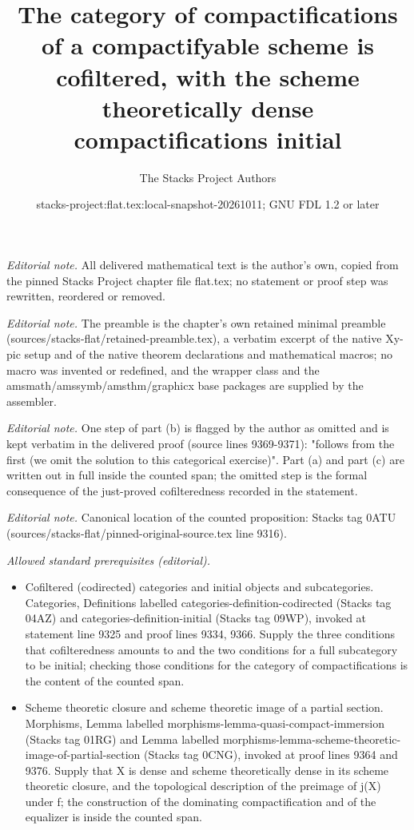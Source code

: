 \documentclass[10pt,a4paper]{amsart}
\title{The category of compactifications of a compactifyable scheme is cofiltered, with the scheme theoretically dense compactifications initial}
\author{The Stacks Project Authors}
\date{stacks-project:flat.tex:local-snapshot-20261011; GNU FDL 1.2 or later}
\theoremstyle{plain}
\theoremstyle{definition}
\theoremstyle{remark}
\numberwithin{equation}{subsection}
\begin{document}
\maketitle
\noindent\textit{Editorial note.} All delivered mathematical text is the author's own, copied from the pinned Stacks Project chapter file flat.tex; no statement or proof step was rewritten, reordered or removed.\par\medskip
\noindent\textit{Editorial note.} The preamble is the chapter's own retained minimal preamble (sources/stacks-flat/retained-preamble.tex), a verbatim excerpt of the native Xy-pic setup and of the native theorem declarations and mathematical macros; no macro was invented or redefined, and the wrapper class and the amsmath/amssymb/amsthm/graphicx base packages are supplied by the assembler.\par\medskip
\noindent\textit{Editorial note.} One step of part (b) is flagged by the author as omitted and is kept verbatim in the delivered proof (source lines 9369-9371): "follows from the first (we omit the solution to this categorical exercise)". Part (a) and part (c) are written out in full inside the counted span; the omitted step is the formal consequence of the just-proved cofilteredness recorded in the statement.\par\medskip
\noindent\textit{Editorial note.} Canonical location of the counted proposition: Stacks tag 0ATU (sources/stacks-flat/pinned-original-source.tex line 9316).\par\medskip
\noindent\textit{Allowed standard prerequisites (editorial).}\begin{itemize}
\item Cofiltered (codirected) categories and initial objects and subcategories. Categories, Definitions labelled categories-definition-codirected (Stacks tag 04AZ) and categories-definition-initial (Stacks tag 09WP), invoked at statement line 9325 and proof lines 9334, 9366. Supply the three conditions that cofilteredness amounts to and the two conditions for a full subcategory to be initial; checking those conditions for the category of compactifications is the content of the counted span.
\item Scheme theoretic closure and scheme theoretic image of a partial section. Morphisms, Lemma labelled morphisms-lemma-quasi-compact-immersion (Stacks tag 01RG) and Lemma labelled morphisms-lemma-scheme-theoretic-image-of-partial-section (Stacks tag 0CNG), invoked at proof lines 9364 and 9376. Supply that X is dense and scheme theoretically dense in its scheme theoretic closure, and the topological description of the preimage of j(X) under f; the construction of the dominating compactification and of the equalizer is inside the counted span.
\end{itemize}\medskip
\end{document}
